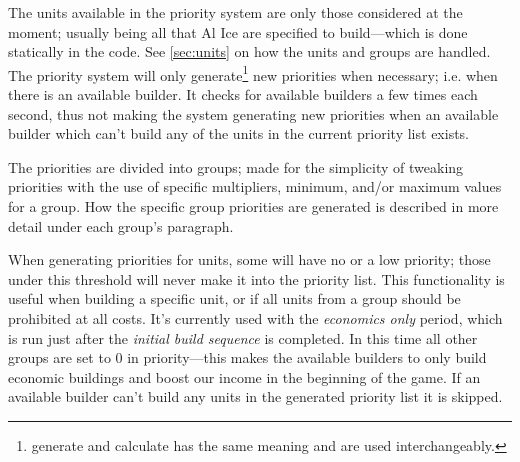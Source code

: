 The units available in the priority system are only those considered at the moment; usually being all
that Al Ice are specified to build---which is done statically in the code.  See \ref{sec:units} on
how the units and groups are handled. The priority system will only generate\footnote{generate and
calculate has the same meaning and are used interchangeably.} new priorities when necessary; i.e.
when there is an available builder. It checks for available builders a few times each second, thus
not making the system generating new priorities when an available builder which can't build any of
the units in the current priority list exists. 


The priorities are divided into groups; made for the simplicity of
tweaking priorities with the use of specific multipliers, minimum, and/or
maximum values for a group. How the specific group priorities are generated
is described in more detail under each group's paragraph.

When generating priorities for units, some will have no or a low priority; those under
this threshold will never make it into the priority list. This functionality is useful when building
a specific unit, or if all units from a group should be prohibited at all costs. It's currently used
with the \emph{economics only} period, which is run just after the
\emph{initial build sequence} is completed. In this time all other groups are set to
0 in priority---this makes the available builders to only build economic buildings and boost our
income in the beginning of the game. If an available builder can't build any units in the generated priority list it is skipped.


